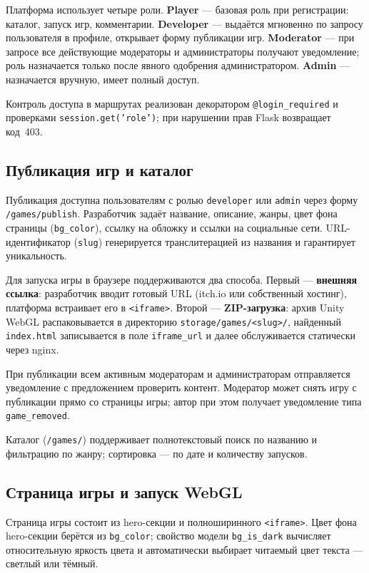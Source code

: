 Платформа использует четыре роли. \textbf{Player} --- базовая роль при
регистрации: каталог, запуск игр, комментарии. \textbf{Developer} ---
выдаётся мгновенно по запросу пользователя в профиле, открывает форму
публикации игр. \textbf{Moderator} --- при запросе все действующие
модераторы и администраторы получают уведомление; роль назначается только
после явного одобрения администратором. \textbf{Admin} --- назначается вручную,
имеет полный доступ.

Контроль доступа в маршрутах реализован декоратором \texttt{@login\_required}
и проверками \texttt{session.get('role')}; при нарушении прав Flask возвращает
код~403.

\subsection{Публикация игр и каталог}

Публикация доступна пользователям с ролью \texttt{developer} или \texttt{admin}
через форму \texttt{/games/publish}. Разработчик задаёт название, описание,
жанры, цвет фона страницы (\texttt{bg\_color}), ссылку на обложку и ссылки
на социальные сети. URL-идентификатор (\texttt{slug}) генерируется
транслитерацией из названия и гарантирует уникальность.

Для запуска игры в браузере поддерживаются два способа. Первый ---
\textbf{внешняя ссылка}: разработчик вводит готовый URL (itch.io или собственный
хостинг), платформа встраивает его в \texttt{<iframe>}. Второй ---
\textbf{ZIP-загрузка}: архив Unity WebGL распаковывается в директорию
\texttt{storage/games/<slug>/}, найденный \texttt{index.html} записывается
в поле \texttt{iframe\_url} и далее обслуживается статически через nginx.

При публикации всем активным модераторам и администраторам отправляется
уведомление с предложением проверить контент. Модератор может снять игру с
публикации прямо со страницы игры; автор при этом получает уведомление типа
\texttt{game\_removed}.

Каталог (\texttt{/games/}) поддерживает полнотекстовый поиск по названию и
фильтрацию по жанру; сортировка --- по дате и количеству запусков.

\subsection{Страница игры и запуск WebGL}

Страница игры состоит из hero-секции и полноширинного \texttt{<iframe>}.
Цвет фона hero-секции берётся из \texttt{bg\_color}; свойство модели
\texttt{bg\_is\_dark} вычисляет относительную яркость цвета и автоматически
выбирает читаемый цвет текста --- светлый или тёмный.

